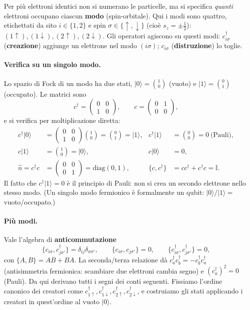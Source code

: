 \documentclass[11pt,a4paper]{article}
\newcommand{\ket}[1]{\lvert #1 \rangle}
\newcommand{\up}{\uparrow}
\newcommand{\dn}{\downarrow}
\newcommand{\dg}{\dagger}
\newcommand{\opn}{\hat{n}}
\theoremstyle{definition}
\theoremstyle{remark}
\begin{document}
Per più elettroni identici non si numerano le particelle, ma si specifica \emph{quanti} elettroni occupano
ciascun \textbf{modo} (spin-orbitale). Qui i modi sono quattro, etichettati da sito $i\in\{1,2\}$ e spin
$\sigma\in\{\up,\dn\}$ (cioè $s_z=\pm\tfrac12$): $(1\up),(1\dn),(2\up),(2\dn)$. Gli operatori agiscono su
questi modi: $c_{i\sigma}^{\dg}$ (\textbf{creazione}) aggiunge un elettrone nel modo $(i\sigma)$;
$c_{i\sigma}$ (\textbf{distruzione}) lo toglie.

\paragraph{Verifica su un singolo modo.} Lo spazio di Fock di un modo ha due stati, $\ket{0}=\binom{1}{0}$
(vuoto) e $\ket{1}=\binom{0}{1}$ (occupato). Le matrici sono
\begin{equation}
c^{\dg}=\begin{pmatrix}0&0\\1&0\end{pmatrix},\qquad c=\begin{pmatrix}0&1\\0&0\end{pmatrix},
\end{equation}
e si verifica per moltiplicazione diretta:
\begin{align}
c^{\dg}\ket{0}&=\begin{pmatrix}0&0\\1&0\end{pmatrix}\!\binom{1}{0}=\binom{0}{1}=\ket{1},
& c^{\dg}\ket{1}&=\binom{0}{0}=0 \ \text{(Pauli)},\\
c\ket{1}&=\binom{1}{0}=\ket{0}, & c\ket{0}&=0 ,\\
\opn=c^{\dg}c&=\begin{pmatrix}0&0\\0&1\end{pmatrix}=\mathrm{diag}(0,1), &
\{c,c^{\dg}\}&=cc^{\dg}+c^{\dg}c=\mathbb{I}.
\end{align}
Il fatto che $c^{\dg}\ket{1}=0$ è il principio di Pauli: non si crea un secondo elettrone nello stesso
modo. (Un singolo modo fermionico è formalmente un qubit: $\ket{0}/\ket{1}=$ vuoto/occupato.)

\paragraph{Più modi.} Vale l'algebra di \textbf{anticommutazione}
\begin{equation}
\{c_{i\sigma},c_{j\sigma'}^{\dg}\}=\delta_{ij}\delta_{\sigma\sigma'},\qquad
\{c_{i\sigma},c_{j\sigma'}\}=0,\qquad
\{c_{i\sigma}^{\dg},c_{j\sigma'}^{\dg}\}=0,
\label{eq:anticomm}
\end{equation}
con $\{A,B\}=AB+BA$. La seconda/terza relazione dà $c_a^{\dg}c_b^{\dg}=-c_b^{\dg}c_a^{\dg}$
(antisimmetria fermionica: scambiare due elettroni cambia segno) e $(c_a^{\dg})^2=0$ (Pauli). Da qui
derivano tutti i segni dei conti seguenti. Fissiamo l'ordine canonico dei creatori come
$c_{1\up}^{\dg},c_{1\dn}^{\dg},c_{2\up}^{\dg},c_{2\dn}^{\dg}$, e costruiamo gli stati applicando i creatori
in quest'ordine al vuoto $\ket{0}$.
\end{document}
